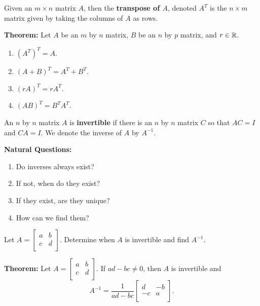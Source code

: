 \begin{enumerate}
\begin{enumerate}
\end{enumerate}

\newpage


\begin{defn}
Given an $m\times n$ matrix $A$, then the {\bf transpose of $A$}, denoted $A^{T}$ is the $n \times m$ matrix given by taking the columns of $A$ as rows.
\end{defn}

{\bf Theorem:} Let $A$ be an $m$ by $n$ matrix, $B$ be an $n$ by $p$ matrix, and $r\in \mathbb{R}$.
\begin{enumerate}
\item $(A^{T})^{T}=A.$
\item $(A+B)^{T}=A^{T}+B^{T}.$
\item $(rA)^{T}=r A^{T}$.
\item $(AB)^{T}=B^{T} A^{T}$.
\end{enumerate}

\begin{defn}
An $n$ by $n$ matrix $A$ is {\bf invertible} if there is an $n$ by $n$ matrix $C$ so that $AC=I$ and $CA=I$. We denote the inverse of $A$ by $A^{-1}$.
\end{defn}

{\bf Natural Questions:}
\begin{enumerate}
\item Do inverses always exist?
\item If not, when do they exist?
\item If they exist, are they unique?
\item How can we find them?
\end{enumerate}

\Problem Let $A=\begin{bmatrix} a & b\\ c & d\\ \end{bmatrix}$. Determine when $A$ is invertible and find $A^{-1}$. 

\newpage

{\bf Theorem:} Let $A=\begin{bmatrix} a & b \\ c & d\\ \end{bmatrix}$. If $ad-bc\neq 0$, then $A$ is invertible  and $$A^{-1}= \frac{1}{ad-bc} \begin{bmatrix} d & -b\\ -c &a \\ \end{bmatrix}.$$


\end{enumerate}
